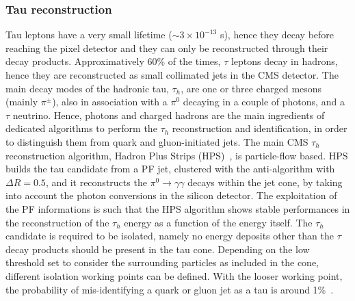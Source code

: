 
\subsubsection{Tau reconstruction}
\noindent Tau leptons have a very small lifetime ($\sim 3 \times 10^{-13}$ s), hence they decay before reaching the pixel detector and they can only be reconstructed through their decay products. Approximatively 60\% of the times, $\tau$ leptons decay in hadrons, hence they are reconstructed as small collimated jets in the CMS detector. The main decay modes of the hadronic tau, $\tau_h$, are one or three charged mesons (mainly $\pi^{\pm}$), also in association with a $\pi^0$ decaying in a couple of photons, and a $\tau$ neutrino. Hence, photons and charged hadrons are the main ingredients of dedicated algorithms to perform the $\tau_h$ reconstruction and identification, in order to distinguish them from quark and gluon-initiated jets. The main CMS $\tau_h$ reconstruction algorithm, Hadron Plus Strips (HPS)~\cite{Chatrchyan:2012zz}, is particle-flow based. HPS builds the tau candidate from a PF jet, clustered with the anti-\kt algorithm with $\Delta R = 0.5$, and it reconstructs the $\pi^0 \rightarrow \gamma \gamma$ decays within the jet cone, by taking into account the photon conversions in the silicon detector. The exploitation of the PF informations is such that the HPS algorithm shows stable performances in the reconstruction of the $\tau_h$ energy as a function of the energy itself. The $\tau_h$ candidate is required to be isolated, namely no energy deposits other than the $\tau$ decay products should be present in the tau cone. Depending on the low threshold set to consider the surrounding particles as included in the cone, different isolation working points can be defined. With the looser working point, the probability of mis-identifying a quark or gluon jet as a tau is around 1\%~\cite{Chatrchyan:2012zz}.

